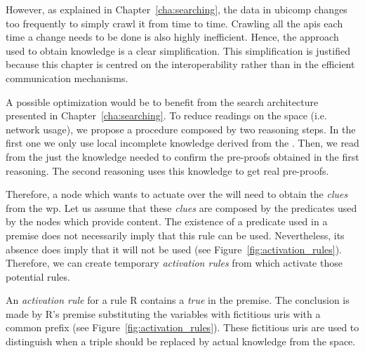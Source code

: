 However, as explained in Chapter~\ref{cha:searching}, the data in \ac{ubicomp} changes too frequently to simply crawl it from time to time.
Crawling all the \acsp{api} each time a change needs to be done is also highly inefficient.
Hence, the approach used to obtain knowledge is a clear simplification.
This simplification is justified because this chapter is centred on the interoperability rather than in the efficient communication mechanisms.


\bigskip


A possible optimization would be to benefit from the search architecture presented in Chapter~\ref{cha:searching}.
To reduce readings on the space (i.e. network usage), we propose a procedure composed by two reasoning steps.
In the first one we only use local incomplete knowledge derived from the \clues{}.
Then, we read from the \Space{} just the knowledge needed to confirm the pre-proofs obtained in the first reasoning.
The second reasoning uses this knowledge to get real pre-proofs. %


Therefore, a node which wants to actuate over the \Space{} will need to obtain the \emph{clues} from the \ac{wp}.
Let us assume that these \emph{clues} are composed by the predicates used by the nodes which provide content. %
The existence of a predicate used in a premise does not necessarily imply that this rule can be used.
Nevertheless, its absence does imply that it will not be used (see Figure~\ref{fig:activation_rules}).
Therefore, we can create temporary \emph{activation rules} from \clues{} which activate those potential rules. %




An \emph{activation rule} for a rule R contains a \emph{true} in the premise.
The conclusion is made by R's premise substituting the variables with fictitious \acsp{uri} with a common prefix (see Figure~\ref{fig:activation_rules}).
These fictitious \acsp{uri} are used to distinguish when a triple should be replaced by actual knowledge from the space. %



